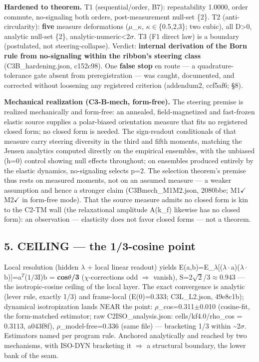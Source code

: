 \documentclass[
  11pt]{article}
\begin{document}
\textbf{Hardened to theorem.} T1 (sequential/order, B7): repeatability
1.0000, order commute, no-signaling both orders, post-measurement
null-set \{2\}. T2 (anti-circularity): \textbf{five} measure
deformations ($\mu$\_$\kappa$, $\kappa\in$\{0.5,2,3\}; two cubic), all D\textgreater0,
analytic null-set \{2\}, \textbar analytic-numeric\textbar\textless2$\sigma$.
T3 (F1 direct law) is a boundary (postulated, not steering-collapse).
Verdict: \textbf{internal derivation of the Born rule from no-signaling
within the ribbon's steering class} (C3B\_hardening.json, c152c98). One
\textbf{false stop} en route --- a quadrature-tolerance gate absent from
preregistration --- was caught, documented, and corrected without
loosening any registered criterion (addendum2, ccf5af6; \S8).

\textbf{Mechanical realization (C3-B-mech, form-free).} The steering
premise is realized mechanically and form-free: an annealed,
field-magnetized and fast-frozen elastic source supplies a polar-biased
orientation measure that fits no registered closed form; no closed form
is needed. The sign-readout conditionals of that measure carry steering
diversity in the third and fifth moments, matching the Jensen analytics
computed directly on the empirical ensembles, with the unbiased (h=0)
control showing null effects throughout; on ensembles produced entirely
by the elastic dynamics, no-signaling selects p=2. The selection
theorem's premise thus rests on measured moments, not on an assumed
measure --- a weaker assumption and hence a stronger claim
(C3Bmech\_M1M2.json, 2080bbe; M1\(\checkmark\)M2\(\checkmark\) in
form-free mode). That the source measure admits no closed form is kin to
the C2-TM wall (the relaxational amplitude A(k\_f) likewise has no
closed form): an observation --- elasticity does not favor closed forms
--- not a theorem.

\subsection{5. CEILING --- the 1/3-cosine
point}\label{ceiling-the-13-cosine-point}

Local resolution (hidden $\lambda$ + local linear readout) yields
E(a,b)=E\_$\lambda${[}($\lambda\cdot$a)($\lambda\cdot$b){]}=a$^{T}$($1/3$I)b = \textbf{cos$\theta$/3} ($\chi$-corrections odd
$\Rightarrow$ vanish), S=$2\sqrt{2}$/3$\approx$0.943 --- the isotropic-cosine ceiling of the local
layer. The exact convergence is analytic (lever rule, exactly 1/3) and
frame-local (E(0)=0.333; C3L\_L2.json, 49e8c1b); dynamical
isotropization lands NEAR the point: $\rho$\_cos=0.311$\pm$0.010 (cosine-fit, the
form-matched estimator; raw C2ISO\_analysis.json: cells/kf4.0/rho\_cos =
0.3113, a043f8f), $\rho$\_model-free=0.336 (same file) --- bracketing 1/3
within \textasciitilde2$\sigma$. Estimators named per program rule. Anchored
analytically and reached by two mechanisms, with ISO-DYN bracketing it $\Rightarrow$
a structural boundary, the lower bank of the seam.
\end{document}
